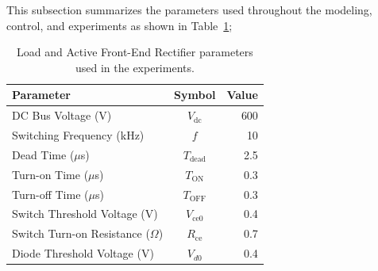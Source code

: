 \label{subsec:motor-params-3col}












This subsection summarizes the parameters used throughout the modeling, control, and experiments as shown in  Table~\ref{tab:drive-motor-params};

\begin{table}[H]

	\centering

	\caption{Load and Active Front-End Rectifier parameters used in the experiments.}

	\label{tab:drive-motor-params}

	\begin{tabular}{l c r}

		\toprule

		\textbf{Parameter} & \textbf{Symbol} & \textbf{Value} \\

		\midrule

		DC Bus Voltage (V)                    & $V_{\mathrm{dc}}$    &600\\

		Switching Frequency (kHz)             & $f$                  &10  \\

		Dead Time ($\mu$s)                    & $T_{\mathrm{dead}}$  &2.5  \\

		Turn-on Time ($\mu$s)                 & $T_{\mathrm{ON}}$    &0.3  \\

		Turn-off Time ($\mu$s)                & $T_{\mathrm{OFF}}$   &0.3  \\

		Switch Threshold Voltage (V)          & $V_{\mathrm{ce0}}$   &0.4  \\

		Switch Turn-on Resistance ($\Omega$)  & $R_{\mathrm{ce}}$    &0.7  \\

		Diode Threshold Voltage (V)           & $V_{d0}$             &0.4  \\


\end{tabular}
\end{table}
